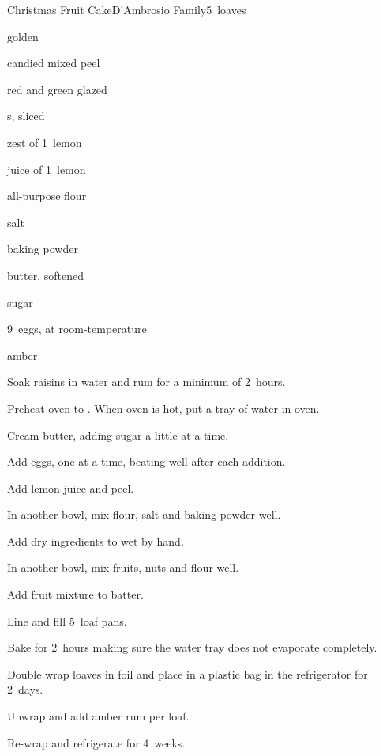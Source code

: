 \begin{recipe}{Christmas Fruit Cake}{D'Ambrosio Family}{5~loaves}

\begin{ingredients}
\item {} golden 
\item {} candied mixed peel
\item \C{1\half} red and green glazed 
\item {} s, sliced
\item zest of 1~lemon
\item juice of 1~lemon
\item \C{4\half} all-purpose flour
\item {} salt
\item {} baking powder
\item {} butter, softened
\item {} sugar
\item 9~eggs, at room-temperature
\item amber 
\end{ingredients}

\begin{directions}
\item Soak raisins in water and rum for a minimum of 2~hours.
\item Preheat oven to . When oven is hot, put a tray of water in oven.
\item Cream butter, adding sugar a little at a time.
\item Add eggs, one at a time, beating well after each addition.
\item Add lemon juice and peel.
\item In another bowl, mix  flour, salt and baking powder well.
\item Add dry ingredients to wet by hand.
\item In another bowl, mix fruits, nuts and \C{\half} flour well.
\item Add fruit mixture to batter.
\item Line and fill 5~loaf pans.
\item Bake for 2~hours making sure the water tray does not evaporate completely.
\item Double wrap loaves in foil and place in a plastic bag in the refrigerator for 2~days.
\item Unwrap and add \C{\third} amber rum per loaf.
\item Re-wrap and refrigerate for 4~weeks.
\end{directions}
\end{recipe}
